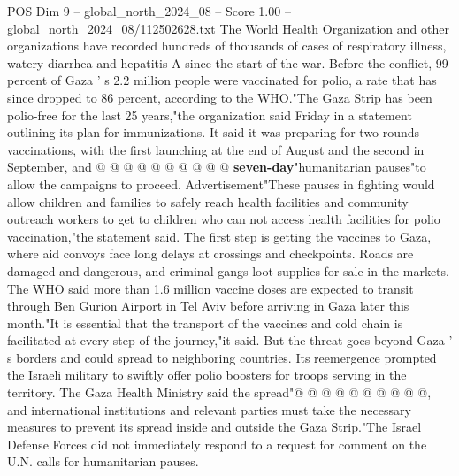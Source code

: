 \begin{textsample}{POS Dim 9 – global\_north\_2024\_08 – Score 1.00 – global\_north\_2024\_08/112502628.txt}
The World Health Organization and other organizations have recorded hundreds of thousands of cases of respiratory illness, watery diarrhea and hepatitis A since the start of the war.
Before the conflict, 99 percent of Gaza ' s 2.2 million people were vaccinated for polio, a rate that has since dropped to 86 percent, according to the WHO."The Gaza Strip has been polio-free for the last 25 years,"the organization said Friday in a statement outlining its plan for immunizations.
It said it was preparing for two rounds vaccinations, with the first launching at the end of August and the second in September, and @ @ @ @ @ @ @ @ @ @ \textbf{seven-day}"humanitarian pauses"to allow the campaigns to proceed.
Advertisement"These pauses in fighting would allow children and families to safely reach health facilities and community outreach workers to get to children who can not access health facilities for polio vaccination,"the statement said.
The first step is getting the vaccines to Gaza, where aid convoys face long delays at crossings and checkpoints.
Roads are damaged and dangerous, and criminal gangs loot supplies for sale in the markets.
The WHO said more than 1.6 million vaccine doses are expected to transit through Ben Gurion Airport in Tel Aviv before arriving in Gaza later this month."It is essential that the transport of the vaccines and cold chain is facilitated at every step of the journey,"it said.
But the threat goes beyond Gaza ' s borders and could spread to neighboring countries.
Its reemergence prompted the Israeli military to swiftly offer polio boosters for troops serving in the territory.
The Gaza Health Ministry said the spread"@ @ @ @ @ @ @ @ @ @, and international institutions and relevant parties must take the necessary measures to prevent its spread inside and outside the Gaza Strip."The Israel Defense Forces did not immediately respond to a request for comment on the U.N. calls for humanitarian pauses.

\end{textsample}
